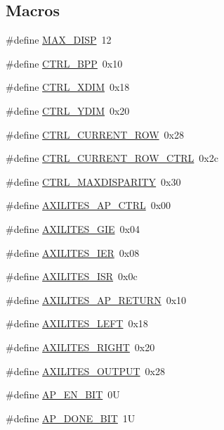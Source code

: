 \subsection*{Macros}
\begin{DoxyCompactItemize}
\item 
\#define \hyperlink{bm-hw-ip_8cpp_a54d979456c9969a8cf5132ee39a4c9bc}{M\+A\+X\+\_\+\+D\+I\+SP}~12
\item 
\#define \hyperlink{bm-hw-ip_8cpp_a435f899ff44eecd8e0dedd26c624a151}{C\+T\+R\+L\+\_\+\+B\+PP}~0x10
\item 
\#define \hyperlink{bm-hw-ip_8cpp_aeb96a2577ceac361cd96b403eca35044}{C\+T\+R\+L\+\_\+\+X\+D\+IM}~0x18
\item 
\#define \hyperlink{bm-hw-ip_8cpp_aaa61d5823190114e006260fb733e5e82}{C\+T\+R\+L\+\_\+\+Y\+D\+IM}~0x20
\item 
\#define \hyperlink{bm-hw-ip_8cpp_a3c2719c36b69d32310520966b8027d28}{C\+T\+R\+L\+\_\+\+C\+U\+R\+R\+E\+N\+T\+\_\+\+R\+OW}~0x28
\item 
\#define \hyperlink{bm-hw-ip_8cpp_a13f23608dca3cf0b939c586f2aef961f}{C\+T\+R\+L\+\_\+\+C\+U\+R\+R\+E\+N\+T\+\_\+\+R\+O\+W\+\_\+\+C\+T\+RL}~0x2c
\item 
\#define \hyperlink{bm-hw-ip_8cpp_ae9c1de4d1f380d0d1acf46b0cf88456e}{C\+T\+R\+L\+\_\+\+M\+A\+X\+D\+I\+S\+P\+A\+R\+I\+TY}~0x30
\item 
\#define \hyperlink{bm-hw-ip_8cpp_a18f79d86a6a5a36f2e9f72630af88923}{A\+X\+I\+L\+I\+T\+E\+S\+\_\+\+A\+P\+\_\+\+C\+T\+RL}~0x00
\item 
\#define \hyperlink{bm-hw-ip_8cpp_a202988bcd3de3dcacdc550382b76bb10}{A\+X\+I\+L\+I\+T\+E\+S\+\_\+\+G\+IE}~0x04
\item 
\#define \hyperlink{bm-hw-ip_8cpp_af118e9c8e023df34cfd732022ffc5052}{A\+X\+I\+L\+I\+T\+E\+S\+\_\+\+I\+ER}~0x08
\item 
\#define \hyperlink{bm-hw-ip_8cpp_acf88b636ca246d88ca4dc8bb4d803ce1}{A\+X\+I\+L\+I\+T\+E\+S\+\_\+\+I\+SR}~0x0c
\item 
\#define \hyperlink{bm-hw-ip_8cpp_a2c2fe3f7d9f197adf0be653cd7f5afda}{A\+X\+I\+L\+I\+T\+E\+S\+\_\+\+A\+P\+\_\+\+R\+E\+T\+U\+RN}~0x10
\item 
\#define \hyperlink{bm-hw-ip_8cpp_a8f1d02722e7ff7d91defc351a1575e52}{A\+X\+I\+L\+I\+T\+E\+S\+\_\+\+L\+E\+FT}~0x18
\item 
\#define \hyperlink{bm-hw-ip_8cpp_a2859628312a9a269821eda5c9e1a5db4}{A\+X\+I\+L\+I\+T\+E\+S\+\_\+\+R\+I\+G\+HT}~0x20
\item 
\#define \hyperlink{bm-hw-ip_8cpp_a26b21b4be758a8e27ef77a4fa51d0640}{A\+X\+I\+L\+I\+T\+E\+S\+\_\+\+O\+U\+T\+P\+UT}~0x28
\item 
\#define \hyperlink{bm-hw-ip_8cpp_a6f4ae195d2c5d14f499036d7b7952fed}{A\+P\+\_\+\+E\+N\+\_\+\+B\+IT}~0U
\item 
\#define \hyperlink{bm-hw-ip_8cpp_ac41f006533297629f93c22fa60bf910d}{A\+P\+\_\+\+D\+O\+N\+E\+\_\+\+B\+IT}~1U
\end{DoxyCompactItemize}


